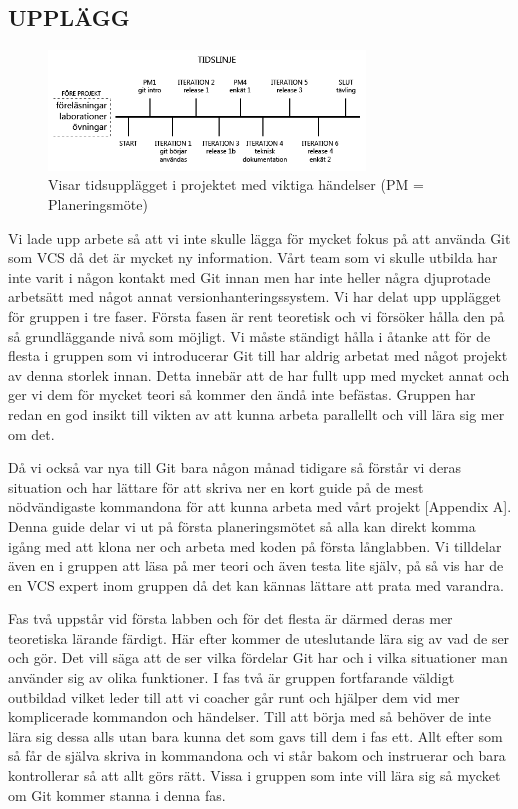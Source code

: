 \subsection{UPPLÄGG}
\label{Upplagg}

\begin{figure}[htb!]\centering\includegraphics[width=0.75\textwidth]{Tidslinje.png}\caption{Visar tidsupplägget i projektet med viktiga händelser (PM = Planeringsmöte)}\label{fig:Timeline}\end{figure}

Vi lade upp arbete så att vi inte skulle lägga för mycket fokus på att använda Git som VCS då det är mycket ny information. Vårt team som vi skulle utbilda har inte varit i någon kontakt med Git innan men har inte heller några djuprotade arbetsätt med något annat versionhanteringssystem. Vi har delat upp upplägget för gruppen i tre faser. Första fasen är rent teoretisk och vi försöker hålla den på så grundläggande nivå som möjligt. Vi måste ständigt hålla i åtanke att för de flesta i gruppen som vi introducerar Git till har aldrig arbetat med något projekt av denna storlek innan. Detta innebär att de har fullt upp med mycket annat och ger vi dem för mycket teori så kommer den ändå inte befästas. Gruppen har redan en god insikt till vikten av att kunna arbeta parallellt och vill lära sig mer om det. 

Då vi också var nya till Git bara någon månad tidigare så förstår vi deras situation och har lättare för att skriva ner en kort guide på de mest nödvändigaste kommandona för att kunna arbeta med vårt projekt [Appendix A]. Denna guide delar vi ut på första planeringsmötet så alla kan direkt komma igång med att klona ner och arbeta med koden på första långlabben. Vi tilldelar även en i gruppen att läsa på mer teori och även testa lite själv, på så vis har de en VCS expert inom gruppen då det kan kännas lättare att prata med varandra.
 
Fas två uppstår vid första labben och för det flesta är därmed deras mer teoretiska lärande färdigt. Här efter kommer de uteslutande lära sig av vad de ser och gör. Det vill säga att de ser vilka fördelar Git har och i vilka situationer man använder sig av olika funktioner. I fas två är gruppen fortfarande väldigt outbildad vilket leder till att vi coacher går runt och hjälper dem vid mer komplicerade kommandon och händelser. Till att börja med så behöver de inte lära sig dessa alls utan bara kunna det som gavs till dem i fas ett. Allt efter som så får de själva skriva in kommandona och vi står bakom och instruerar och bara kontrollerar så att allt görs rätt. Vissa i gruppen som inte vill lära sig så mycket om Git kommer stanna i denna fas.

